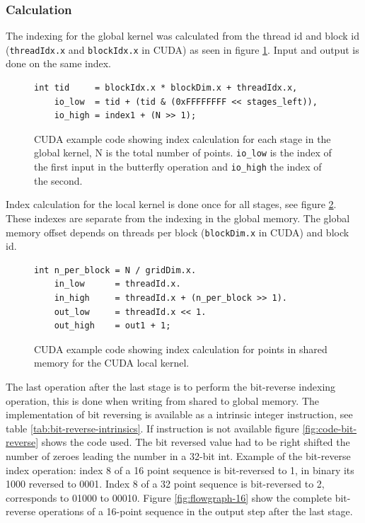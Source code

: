 \subsubsection{Calculation}

The indexing for the global kernel was calculated from the thread id and block id (\texttt{threadIdx.x} and \texttt{blockIdx.x} in CUDA) as seen in figure \ref{fig:code-global-index}. Input and output is done on the same index.
\begin{figure}
	\centering
	\lstset{language=C++}
	\begin{framed}
	\begin{lstlisting}
int tid     = blockIdx.x * blockDim.x + threadIdx.x,
    io_low  = tid + (tid & (0xFFFFFFFF << stages_left)),
    io_high = index1 + (N >> 1);
	\end{lstlisting}
	\end{framed}
	\caption{ CUDA example code showing index calculation for each stage in the global kernel, N is the total number of points. \texttt{io\_low} is the index of the first input in the butterfly operation and \texttt{io\_high} the index of the second.}
	\label{fig:code-global-index}
\end{figure}

Index calculation for the local kernel is done once for all stages, see figure \ref{fig:code-local-index}. These indexes are separate from the indexing in the global memory. The global memory offset depends on threads per block (\texttt{blockDim.x} in CUDA) and block id.
\begin{figure}
	\centering
	\lstset{language=C++}
	\begin{framed}
	\begin{lstlisting}
int n_per_block = N / gridDim.x.
    in_low      = threadId.x.
    in_high     = threadId.x + (n_per_block >> 1).
    out_low     = threadId.x << 1.
    out_high    = out1 + 1;
	\end{lstlisting}
	\end{framed}
	\caption{ CUDA example code showing index calculation for points in shared memory for the CUDA local kernel. }
	\label{fig:code-local-index}
\end{figure}

The last operation after the last stage is to perform the bit-reverse indexing operation, this is done when writing from shared to global memory. The implementation of bit reversing is available as a intrinsic integer instruction, see table \ref{tab:bit-reverse-intrinsics}. If instruction is not available figure \ref{fig:code-bit-reverse} shows the code used. The bit reversed value had to be right shifted the number of zeroes leading the number in a 32-bit int. Example of the bit-reverse index operation: index 8 of a 16 point sequence is bit-reversed to 1, in binary its 1000 reversed to 0001. Index 8 of a 32 point sequence is bit-reversed to 2, corresponds to 01000 to 00010. Figure \ref{fig:flowgraph-16} show the complete bit-reverse operations of a 16-point sequence in the output step after the last stage.

